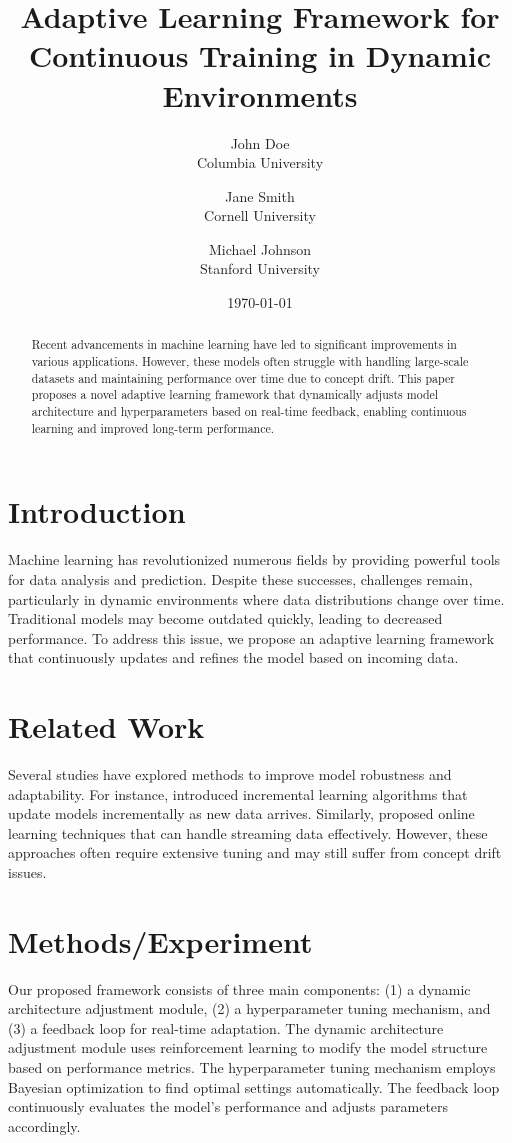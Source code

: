 \documentclass{article}
\title{Adaptive Learning Framework for Continuous Training in Dynamic Environments}
\author{John Doe \\
Columbia University \\
\and Jane Smith \\
Cornell University \\
\and Michael Johnson \\
Stanford University
}
\date{\today}
\begin{document}
\maketitle

\begin{abstract}
Recent advancements in machine learning have led to significant improvements in various applications. However, these models often struggle with handling large-scale datasets and maintaining performance over time due to concept drift. This paper proposes a novel adaptive learning framework that dynamically adjusts model architecture and hyperparameters based on real-time feedback, enabling continuous learning and improved long-term performance.
\end{abstract}

\section{Introduction}
Machine learning has revolutionized numerous fields by providing powerful tools for data analysis and prediction. Despite these successes, challenges remain, particularly in dynamic environments where data distributions change over time. Traditional models may become outdated quickly, leading to decreased performance. To address this issue, we propose an adaptive learning framework that continuously updates and refines the model based on incoming data.

\section{Related Work}
Several studies have explored methods to improve model robustness and adaptability. For instance, \citet{DBLP:journals/corr/BurkhartK17} introduced incremental learning algorithms that update models incrementally as new data arrives. Similarly, \citet{DBLP:journals/corr/abs-1812-07055} proposed online learning techniques that can handle streaming data effectively. However, these approaches often require extensive tuning and may still suffer from concept drift issues.

\section{Methods/Experiment}
Our proposed framework consists of three main components: (1) a dynamic architecture adjustment module, (2) a hyperparameter tuning mechanism, and (3) a feedback loop for real-time adaptation. The dynamic architecture adjustment module uses reinforcement learning to modify the model structure based on performance metrics. The hyperparameter tuning mechanism employs Bayesian optimization to find optimal settings automatically. The feedback loop continuously evaluates the model’s performance and adjusts parameters accordingly.
\end{document}
